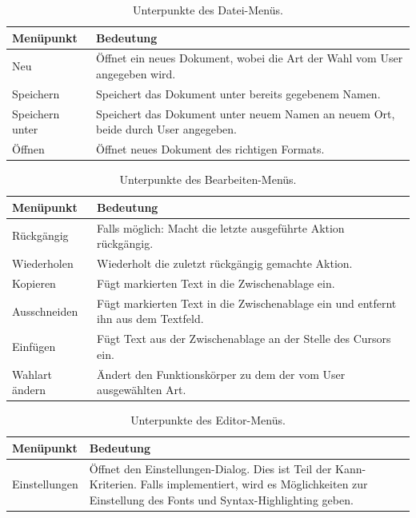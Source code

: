 \documentclass[a4paper]{scrreprt}
\begin{document}
\begin{table}[H]
\begin{tabular}{|p{3cm}|p{12cm}|}
Menüpunkt & Bedeutung \\
\hline
Neu & Öffnet ein neues Dokument, wobei die Art der Wahl vom User angegeben wird. \\
\hline

Speichern & Speichert das Dokument unter bereits gegebenem Namen. \\
\hline

Speichern unter & Speichert das Dokument unter neuem Namen an neuem Ort, beide durch User angegeben. \\
\hline

Öffnen & Öffnet neues Dokument des richtigen Formats.
\end{tabular}
\label{Datei-Menüpunkte}
\caption{Unterpunkte des Datei-Menüs.}
\end{table}

\begin{table}[H]
\begin{tabular}{|p{3cm}|p{12cm}|}
Menüpunkt & Bedeutung \\
\hline
Rückgängig & Falls möglich: Macht die letzte ausgeführte Aktion rückgängig. \\
\hline
Wiederholen & Wiederholt die zuletzt rückgängig gemachte Aktion. \\
\hline
Kopieren & Fügt markierten Text in die Zwischenablage ein. \\
\hline
Ausschneiden & Fügt markierten Text in die Zwischenablage ein und entfernt ihn aus dem Textfeld. \\
\hline
Einfügen & Fügt Text aus der Zwischenablage an der Stelle des Cursors ein. \\
\hline
Wahlart ändern & Ändert den Funktionskörper zu dem der vom User ausgewählten Art.
\end{tabular}
\label{Bearbeiten-Menüpunkte}
\caption{Unterpunkte des Bearbeiten-Menüs.}
\end{table}

\begin{table}[H]
\begin{tabular}{|p{3cm}|p{12cm}|}
Menüpunkt & Bedeutung \\
\hline
Einstellungen & Öffnet den Einstellungen-Dialog. Dies ist Teil der Kann-Kriterien. Falls implementiert, wird es Möglichkeiten zur Einstellung des Fonts und Syntax-Highlighting geben.
\end{tabular}
\label{Editor-Menüpunkte}
\caption{Unterpunkte des Editor-Menüs.}
\end{table}
\end{document}
